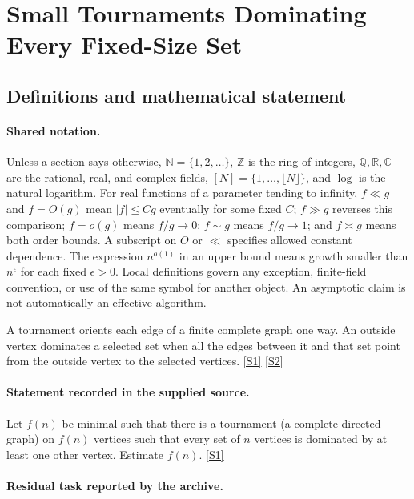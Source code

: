\documentclass[11pt,a4paper]{article}
\newcommand{\N}{\mathbb{N}}
\newcommand{\Z}{\mathbb{Z}}
\newcommand{\Q}{\mathbb{Q}}
\newcommand{\R}{\mathbb{R}}
\newcommand{\C}{\mathbb{C}}
\newcommand{\sref}[2]{\hyperlink{source:#1:#2}{[S#2]}}
\begin{document}
\section{Small Tournaments Dominating Every Fixed-Size Set}\label{statement}


\subsection{Definitions and mathematical statement}

\paragraph{Shared notation.}Unless a section says otherwise, $\N=\{1,2,\ldots\}$,
$\Z$ is the ring of integers, $\Q,\R,\C$ are the rational, real, and complex
fields, $[N]=\{1,\ldots,\lfloor N\rfloor\}$, and $\log$ is the natural
logarithm. For real functions of a parameter tending to infinity,
$f\ll g$ and $f=O(g)$ mean $|f|\leq Cg$ eventually for some fixed $C$;
$f\gg g$ reverses this comparison; $f=o(g)$ means $f/g\to0$;
$f\sim g$ means $f/g\to1$; and $f\asymp g$ means both order bounds.
A subscript on $O$ or $\ll$ specifies allowed constant dependence.
The expression $n^{o(1)}$ in an upper bound means growth smaller than
$n^\epsilon$ for each fixed $\epsilon>0$. Local definitions govern any
exception, finite-field convention, or use of the same symbol for another
object. An asymptotic claim is not automatically an effective algorithm.



A tournament orients each edge of a finite complete graph one way. An outside vertex dominates a selected set when all the edges between it and that set point from the outside vertex to the selected vertices. \sref{statement}{1} \sref{statement}{2}

\paragraph{Statement recorded in the supplied source.}
Let $f(n)$ be minimal such that there is a tournament (a complete directed graph) on $f(n)$ vertices such that every set of $n$ vertices is dominated by at least one other vertex. Estimate $f(n)$. \sref{statement}{1}

\paragraph{Residual task reported by the archive.}
\end{document}
